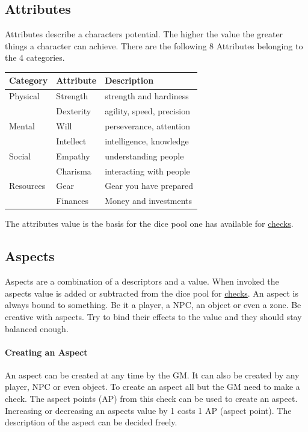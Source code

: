 \documentclass[11pt]{article}
\begin{document}
{\subsection{Attributes}
\label{sec:org3864d98}
Attributes describe a characters potential. The higher the value the greater things a character can achieve. There are the following 8 Attributes belonging to the 4 categories.

\begin{center}
\begin{tabular}{lll}
\textbf{Category} & \textbf{Attribute} & \textbf{Description}\\[0pt]
\hline
Physical & Strength & strength and hardiness\\[0pt]
 & Dexterity & agility, speed, precision\\[0pt]
\hline
Mental & Will & perseverance, attention\\[0pt]
 & Intellect & intelligence, knowledge\\[0pt]
\hline
Social & Empathy & understanding people\\[0pt]
 & Charisma & interacting with people\\[0pt]
\hline
Resources & Gear & Gear you have prepared\\[0pt]
 & Finances & Money and investments\\[0pt]
\end{tabular}
\end{center}

The attributes value is the basis for the dice pool one has available for \hyperref[sec:org616017e]{checks}. 

\subsection{Aspects}
\label{sec:org954617a}
Aspects are a combination of a descriptors and a value. When invoked the aspects value is added or subtracted from the dice pool  for \hyperref[sec:org616017e]{checks}. An aspect is always bound to something. Be it a player, a NPC, an object or even a zone. Be creative with aspects. Try to bind their effects to the value and they should stay balanced enough.

\paragraph*{Creating an Aspect}
\label{sec:orgd60adbd}

An aspect can be created at any time by the GM. It can also be created by any player, NPC or even object. To create an aspect all but the GM need to make a check. The aspect points (AP) from this check can be used to create an aspect. Increasing or decreasing an aspects value by 1 costs 1 AP (aspect point). The description of the aspect can be decided freely. 

}
\end{document}
